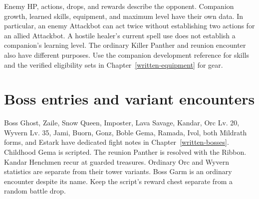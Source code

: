Enemy HP, actions, drops, and rewards describe the opponent. Companion growth, learned skills, equipment, and maximum level have their own data. In particular, an enemy Attackbot can act twice without establishing two actions for an allied Attackbot. A hostile healer's current spell use does not establish a companion's learning level. The ordinary Killer Panther and reunion encounter also have different purposes. Use the companion development reference for skills and the verified eligibility sets in Chapter~\ref{written-equipment} for gear.

\section{Boss entries and variant encounters}
Boss Ghost, Zaile, Snow Queen, Imposter, Lava Savage, Kandar, Orc Lv. 20, Wyvern Lv. 35, Jami, Buorn, Gonz, Boble Gema, Ramada, Ivol, both Mildrath forms, and Estark have dedicated fight notes in Chapter~\ref{written-bosses}. Childhood Gema is scripted. The reunion Panther is resolved with the Ribbon. Kandar Henchmen recur at guarded treasures. Ordinary Orc and Wyvern statistics are separate from their tower variants. Boss Garm is an ordinary encounter despite its name. Keep the script's reward chest separate from a random battle drop.

